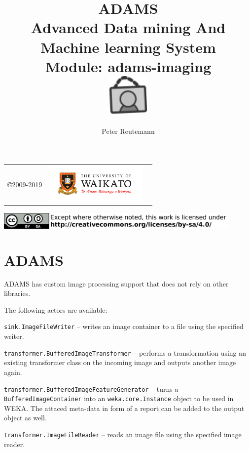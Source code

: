 \documentclass[a4paper]{book}
\title{
  \textbf{ADAMS} \\
  {\Large \textbf{A}dvanced \textbf{D}ata mining \textbf{A}nd \textbf{M}achine
  learning \textbf{S}ystem} \\
  {\Large Module: adams-imaging} \\
  \vspace{1cm}
  \includegraphics[width=2cm]{images/imaging-module.png} \\
}
\author{
  Peter Reutemann
}
\begin{document}
\begin{titlepage}
\maketitle

\thispagestyle{empty}
\center
\begin{table}[b]
	\begin{tabular}{c l l}
		\parbox[c][2cm]{2cm}{\copyright 2009-2019} &
		\parbox[c][2cm]{5cm}{\includegraphics[width=5cm]{images/coat_of_arms.pdf}} \\
	\end{tabular}
	\includegraphics[width=12cm]{images/cc.png} \\
\end{table}

\end{titlepage}

\tableofcontents
\listoffigures


\chapter{ADAMS}
ADAMS has custom image processing support that does not rely on other libraries.

The following actors are available:
\begin{tight_itemize}
	\item \texttt{sink.ImageFileWriter} -- writes an image container to a file
	using the specified writer.
	\item \texttt{transformer.BufferedImageTransformer} -- performs a transformation
	using an existing transformer class on the incoming image and
	outputs another image again.
	\item \texttt{transformer.BufferedImageFeatureGenerator} -- turns a
	\texttt{BufferedImageContainer} into an \texttt{weka.core.Instance} object to
	be used in WEKA. The attaced meta-data in form of a report can be added to the
	output object as well.
	\item \texttt{transformer.ImageFileReader} -- reads an image file using the
	specified image reader.
\end{tight_itemize}
\end{document}
